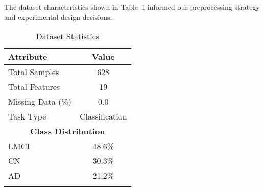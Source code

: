 \documentclass[conference]{IEEEtran}
\begin{document}
The dataset characteristics shown in Table~1 informed our preprocessing strategy and experimental design decisions.


\begin{table}[htbp]
\centering
\caption{Dataset Statistics}
\label{tab:dataset_statistics}
\begin{tabular}{|l|c|}
\hline
\textbf{Attribute} & \textbf{Value} \\
\hline
Total Samples & 628 \\
Total Features & 19 \\
Missing Data (\%) & 0.0 \\
Task Type & Classification \\
\hline
\multicolumn{2}{|c|}{\textbf{Class Distribution}} \\
\hline
LMCI & 48.6\% \\
CN & 30.3\% \\
AD & 21.2\% \\
\hline
\end{{tabular}}
\end{{table}}


\end{tabular}
\end{table}
\end{document}
